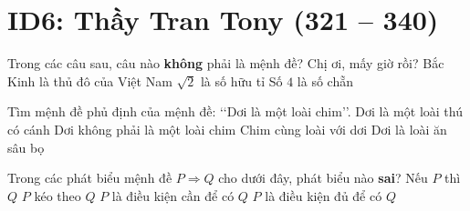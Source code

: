 \section*{ID6: Thầy Tran Tony (321 -- 340)}
\begin{ex}%
	Trong các câu sau, câu nào {\bf không} phải là mệnh đề?
	\choice
	{\True Chị ơi, mấy giờ rồi?}
	{Bắc Kinh là thủ đô của Việt Nam}
	{$\sqrt{2}$ là số hữu tỉ}
	{Số $4$ là số chẵn}
\end{ex}
\begin{ex}%
	Tìm mệnh đề phủ định của mệnh đề: \lq\lq Dơi là một loài chim\rq\rq.
	\choice
	{Dơi là một loài thú có cánh}
	{\True Dơi không phải là một loài chim}
	{Chim cùng loài với dơi}
	{Dơi là loài ăn sâu bọ}
\end{ex}

\begin{ex}%
	Trong các phát biểu mệnh đề $P\Rightarrow Q$ cho dưới đây, phát biểu nào {\bf sai}?
	\choice
	{Nếu $P$ thì $Q$}
	{$P$ kéo theo $Q$}
	{\True $P$ là điều kiện cần để có $Q$}
	{$P$ là điều kiện đủ để có $Q$}
\end{ex}

